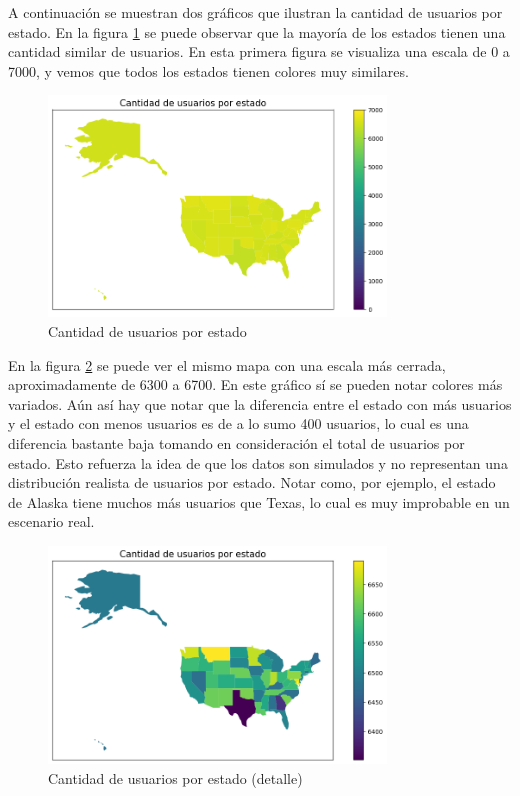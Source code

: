 A continuación se muestran dos gráficos que ilustran la cantidad de usuarios por estado. En la figura \ref{fig:usuarios_por_estado} se puede observar que la mayoría de los estados tienen una cantidad similar de usuarios. En esta primera figura se visualiza una escala de 0 a 7000, y vemos que todos los estados tienen colores muy similares.

\begin{figure}[H]
    \centering
    \includegraphics[width=0.8\textwidth]{imagenes/datos_uniformes/usuarios_por_estado.png}
    \caption{Cantidad de usuarios por estado}
    \label{fig:usuarios_por_estado}
\end{figure}

En la figura \ref{fig:usuarios_por_estado_closer} se puede ver el mismo mapa con una escala más cerrada, aproximadamente de 6300 a 6700. En este gráfico sí se pueden notar colores más variados. Aún así hay que notar que la diferencia entre el estado con más usuarios y el estado con menos usuarios es de a lo sumo 400 usuarios, lo cual es una diferencia bastante baja tomando en consideración el total de usuarios por estado. Esto refuerza la idea de que los datos son simulados y no representan una distribución realista de usuarios por estado. Notar como, por ejemplo, el estado de Alaska  tiene muchos más usuarios que Texas, lo cual es muy improbable en un escenario real.

\begin{figure}[H]
    \centering
    \includegraphics[width=0.8\textwidth]{imagenes/datos_uniformes/usuarios_por_estado_closer.png}
    \caption{Cantidad de usuarios por estado (detalle)}
    \label{fig:usuarios_por_estado_closer}
\end{figure}

